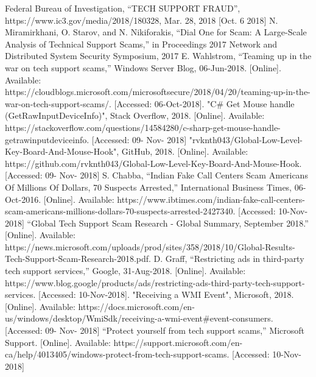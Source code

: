 \documentclass[final]{IEEEtran}
\begin{document}


\begin{thebibliography}{00}
 Federal Bureau of Investigation, ``TECH SUPPORT FRAUD'',  https://www.ic3.gov/media/2018/180328, Mar. 28, 2018 [Oct. 6 2018]
 N. Miramirkhani, O. Starov, and N. Nikiforakis, “Dial One for Scam: A Large-Scale Analysis of Technical Support Scams,” in Proceedings 2017 Network and Distributed System Security Symposium, 2017
E. Wahlstrom, “Teaming up in the war on tech support scams,” Windows Server Blog, 06-Jun-2018. [Online]. Available: https://cloudblogs.microsoft.com/microsoftsecure/2018/04/20/teaming-up-in-the-war-on-tech-support-scams/. [Accessed: 06-Oct-2018].
"C\# Get Mouse handle (GetRawInputDeviceInfo)", Stack Overflow, 2018. [Online]. Available: https://stackoverflow.com/questions/14584280/c-sharp-get-mouse-handle-getrawinputdeviceinfo. [Accessed: 09- Nov- 2018]
"rvknth043/Global-Low-Level-Key-Board-And-Mouse-Hook", GitHub, 2018. [Online]. Available: https://github.com/rvknth043/Global-Low-Level-Key-Board-And-Mouse-Hook. [Accessed: 09- Nov- 2018]
 S. Chabba, “Indian Fake Call Centers Scam Americans Of Millions Of Dollars, 70 Suspects Arrested,” International Business Times, 06-Oct-2016. [Online]. Available: https://www.ibtimes.com/indian-fake-call-centers-scam-americans-millions-dollars-70-suspects-arrested-2427340. [Accessed: 10-Nov-2018]
 “Global Tech Support Scam Research - Global Summary, September 2018.” [Online]. Available: https://news.microsoft.com/uploads/prod/sites/358/2018/10/Global-Results-Tech-Support-Scam-Research-2018.pdf.
 D. Graff, “Restricting ads in third-party tech support services,” Google, 31-Aug-2018. [Online]. Available: https://www.blog.google/products/ads/restricting-ads-third-party-tech-support-services. [Accessed: 10-Nov-2018].
"Receiving a WMI Event", Microsoft, 2018. [Online]. Available: https://docs.microsoft.com/en-us/windows/desktop/WmiSdk/receiving-a-wmi-event\#event-consumers. [Accessed: 09- Nov- 2018]
“Protect yourself from tech support scams,” Microsoft Support. [Online]. Available: https://support.microsoft.com/en-ca/help/4013405/windows-protect-from-tech-support-scams. [Accessed: 10-Nov-2018]

\end{thebibliography}
\end{document}

